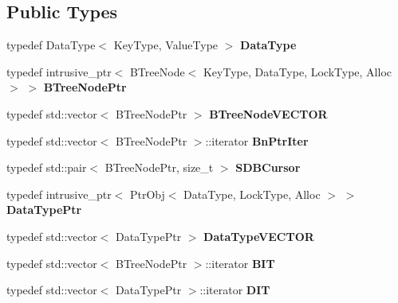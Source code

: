 \subsection*{Public Types}
\begin{CompactItemize}
\item 
\hypertarget{classBTreeFile_134b19172aabde32c62243dbdc152a56}{
typedef DataType$<$ KeyType, ValueType $>$ \textbf{DataType}}
\label{classBTreeFile_134b19172aabde32c62243dbdc152a56}

\item 
\hypertarget{classBTreeFile_4e78d31a7e1d1ef621448d762c6d693a}{
typedef intrusive\_\-ptr$<$ BTreeNode$<$ KeyType, DataType, LockType, Alloc $>$ $>$ \textbf{BTreeNodePtr}}
\label{classBTreeFile_4e78d31a7e1d1ef621448d762c6d693a}

\item 
\hypertarget{classBTreeFile_73a488e58ea39521604de5a3df286716}{
typedef std::vector$<$ BTreeNodePtr $>$ \textbf{BTreeNodeVECTOR}}
\label{classBTreeFile_73a488e58ea39521604de5a3df286716}

\item 
\hypertarget{classBTreeFile_ff079237e9726291f48f7429bc97a3ad}{
typedef std::vector$<$ BTreeNodePtr $>$::iterator \textbf{BnPtrIter}}
\label{classBTreeFile_ff079237e9726291f48f7429bc97a3ad}

\item 
\hypertarget{classBTreeFile_c84b666e8b3083625a71371825583863}{
typedef std::pair$<$ BTreeNodePtr, size\_\-t $>$ \textbf{SDBCursor}}
\label{classBTreeFile_c84b666e8b3083625a71371825583863}

\item 
\hypertarget{classBTreeFile_50d1379e8f22b810c4c53c34072db39c}{
typedef intrusive\_\-ptr$<$ PtrObj$<$ DataType, LockType, Alloc $>$ $>$ \textbf{DataTypePtr}}
\label{classBTreeFile_50d1379e8f22b810c4c53c34072db39c}

\item 
\hypertarget{classBTreeFile_ee29e8d1f6bb9700d852eb1fa914491b}{
typedef std::vector$<$ DataTypePtr $>$ \textbf{DataTypeVECTOR}}
\label{classBTreeFile_ee29e8d1f6bb9700d852eb1fa914491b}

\item 
\hypertarget{classBTreeFile_1cefa5c1f36a97524f0be807a7882813}{
typedef std::vector$<$ BTreeNodePtr $>$::iterator \textbf{BIT}}
\label{classBTreeFile_1cefa5c1f36a97524f0be807a7882813}

\item 
\hypertarget{classBTreeFile_8fc5e3e778b95fc3313ab4680c2e895c}{
typedef std::vector$<$ DataTypePtr $>$::iterator \textbf{DIT}}
\label{classBTreeFile_8fc5e3e778b95fc3313ab4680c2e895c}

\end{CompactItemize}
